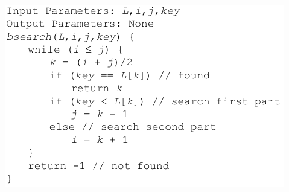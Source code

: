 \documentclass[a4paper]{article}
\begin{document}
\begin{multicols}{2}
        \includegraphics[width=\linewidth]{bsearch.png}
    \end{multicols}
    
\end{document}
